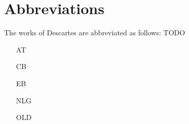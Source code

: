 \chapter{Abbreviations}

The works of Descartes are abbreviated as follows: TODO

\begin{itemize}
    \item[AT] 
    \item[CB] 
    \item[EB] 
    \item[NLG] 
    \item[OLD] 
\end{itemize}
